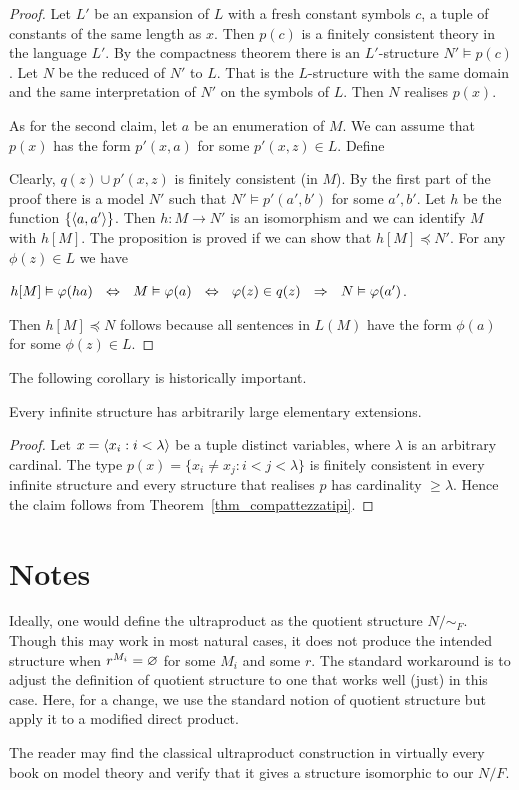 \documentclass[creche.tex]{subfiles}
\begin{document}
\begin{proof}
 
Let $L'$ be an expansion of $L$ with a fresh constant symbols $c$, a tuple of constants of the same length as $x$. Then $p(c)$ is a finitely consistent theory in the language $L'$. By the compactness theorem there is an $L'$-structure $N'\models p(c)$. Let $N$ be the reduced of $N'$ to $L$. That is the $L$-structure with the same domain and the same interpretation of $N'$ on the symbols of $L$. Then $N$ realises $p(x)$.  

As for the second claim, let $a$ be an enumeration of $M$. We can assume that $p(x)$ has the form $p'(x,a)$ for some $p'(x,z)\in L$. Define


Clearly, $q(z)\cup p'(x,z)$ is finitely consistent (in $M$). By the first part of the proof there is a model $N'$ such that $N'\models p'(a',b')$ for some $a',b'$. Let $h$ be the function $\{\langle a,a'\rangle\}$. Then $h:M\to N'$ is an isomorphism and we can identify $M$ with $h[M]$. The proposition is proved if we can show that $h[M]\preceq N'$. For any $\phi(z)\in L$ we have


\hfil $h[M]\vDash\varphi(ha)\ \ \Leftrightarrow\ \  M\vDash \varphi(a)\ \  \Leftrightarrow\ \  \varphi(z)\in q(z)\ \   \Rightarrow\ \  N\vDash \varphi(a')$.

Then $h[M]\preceq N$ follows because all sentences in $L(M)$ have the form $\phi(a)$ for some $\phi(z)\in L$.
\end{proof}

The following corollary is historically important.

\begin{void_thm}
Every infinite structure has arbitrarily large elementary extensions.
\end{void_thm}

\begin{proof}
Let $x=\langle x_i:i<\lambda\rangle$ be a tuple distinct variables, where $\lambda$ is an arbitrary cardinal. The type $p(x)=\big\{x_i\neq x_j: i<j<\lambda\big\}$ is finitely consistent in every infinite structure and every structure that realises $p$ has cardinality $\ge\lambda$. Hence the claim follows from Theorem~\ref{thm_compattezzatipi}.
\end{proof}

\section{Notes}
\label{notes_ultra}
Ideally, one would define the ultraproduct as the quotient structure $N/\mathord{\sim_F}$. Though this may work in most natural cases, it does not produce the intended structure when $r^{M_i}=\varnothing$ for some $M_i$ and some $r$. The standard workaround is to adjust the definition of quotient structure to one that works well (just) in this case. Here, for a change, we use the standard notion of quotient structure but apply it to a modified direct product.

The reader may find the classical ultraproduct construction in virtually every book on model theory and verify that it gives a structure isomorphic to our $N/F$.
\end{document}
